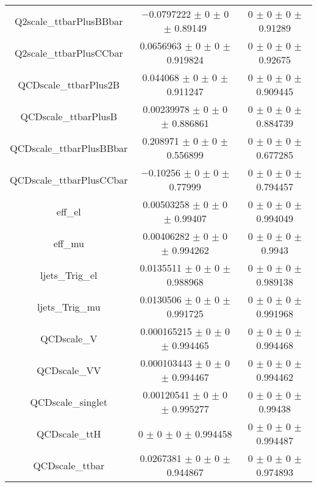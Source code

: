 \begin{table}
\begin{tabular}{ccc}
Q2scale\_ttbarPlusBBbar & \num{-0.0797222} $\pm$ \num{0} $\pm$ \num{0} $\pm$ \num{0.89149} & \num{0} $\pm$ \num{0} $\pm$ \num{0} $\pm$ \num{0.91289}\\
Q2scale\_ttbarPlusCCbar & \num{0.0656963} $\pm$ \num{0} $\pm$ \num{0} $\pm$ \num{0.919824} & \num{0} $\pm$ \num{0} $\pm$ \num{0} $\pm$ \num{0.92675}\\
QCDscale\_ttbarPlus2B & \num{0.044068} $\pm$ \num{0} $\pm$ \num{0} $\pm$ \num{0.911247} & \num{0} $\pm$ \num{0} $\pm$ \num{0} $\pm$ \num{0.909445}\\
QCDscale\_ttbarPlusB & \num{0.00239978} $\pm$ \num{0} $\pm$ \num{0} $\pm$ \num{0.886861} & \num{0} $\pm$ \num{0} $\pm$ \num{0} $\pm$ \num{0.884739}\\
QCDscale\_ttbarPlusBBbar & \num{0.208971} $\pm$ \num{0} $\pm$ \num{0} $\pm$ \num{0.556899} & \num{0} $\pm$ \num{0} $\pm$ \num{0} $\pm$ \num{0.677285}\\
QCDscale\_ttbarPlusCCbar & \num{-0.10256} $\pm$ \num{0} $\pm$ \num{0} $\pm$ \num{0.77999} & \num{0} $\pm$ \num{0} $\pm$ \num{0} $\pm$ \num{0.794457}\\
eff\_el & \num{0.00503258} $\pm$ \num{0} $\pm$ \num{0} $\pm$ \num{0.99407} & \num{0} $\pm$ \num{0} $\pm$ \num{0} $\pm$ \num{0.994049}\\
eff\_mu & \num{0.00406282} $\pm$ \num{0} $\pm$ \num{0} $\pm$ \num{0.994262} & \num{0} $\pm$ \num{0} $\pm$ \num{0} $\pm$ \num{0.9943}\\
ljets\_Trig\_el & \num{0.0135511} $\pm$ \num{0} $\pm$ \num{0} $\pm$ \num{0.988968} & \num{0} $\pm$ \num{0} $\pm$ \num{0} $\pm$ \num{0.989138}\\
ljets\_Trig\_mu & \num{0.0130506} $\pm$ \num{0} $\pm$ \num{0} $\pm$ \num{0.991725} & \num{0} $\pm$ \num{0} $\pm$ \num{0} $\pm$ \num{0.991968}\\
QCDscale\_V & \num{0.000165215} $\pm$ \num{0} $\pm$ \num{0} $\pm$ \num{0.994465} & \num{0} $\pm$ \num{0} $\pm$ \num{0} $\pm$ \num{0.994468}\\
QCDscale\_VV & \num{0.000103443} $\pm$ \num{0} $\pm$ \num{0} $\pm$ \num{0.994467} & \num{0} $\pm$ \num{0} $\pm$ \num{0} $\pm$ \num{0.994462}\\
QCDscale\_singlet & \num{0.00120541} $\pm$ \num{0} $\pm$ \num{0} $\pm$ \num{0.995277} & \num{0} $\pm$ \num{0} $\pm$ \num{0} $\pm$ \num{0.99438}\\
QCDscale\_ttH & \num{0} $\pm$ \num{0} $\pm$ \num{0} $\pm$ \num{0.994458} & \num{0} $\pm$ \num{0} $\pm$ \num{0} $\pm$ \num{0.994487}\\
QCDscale\_ttbar & \num{0.0267381} $\pm$ \num{0} $\pm$ \num{0} $\pm$ \num{0.944867} & \num{0} $\pm$ \num{0} $\pm$ \num{0} $\pm$ \num{0.974893}\\

\end{tabular}
\end{table}
